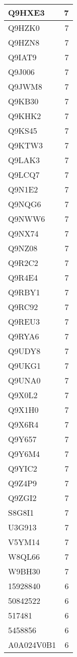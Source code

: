 \documentclass[
]{book}
\theoremstyle{definition}
\theoremstyle{definition}
\theoremstyle{definition}
\theoremstyle{definition}
\theoremstyle{remark}
\begin{document}
\begin{table}
\begin{tabular}{l|r}
\hline
Q9HXE3 & 7\\
\hline
Q9HZK0 & 7\\
\hline
Q9HZN8 & 7\\
\hline
Q9IAT9 & 7\\
\hline
Q9J006 & 7\\
\hline
Q9JWM8 & 7\\
\hline
Q9KB30 & 7\\
\hline
Q9KHK2 & 7\\
\hline
Q9KS45 & 7\\
\hline
Q9KTW3 & 7\\
\hline
Q9LAK3 & 7\\
\hline
Q9LCQ7 & 7\\
\hline
Q9N1E2 & 7\\
\hline
Q9NQG6 & 7\\
\hline
Q9NWW6 & 7\\
\hline
Q9NX74 & 7\\
\hline
Q9NZ08 & 7\\
\hline
Q9R2C2 & 7\\
\hline
Q9R4E4 & 7\\
\hline
Q9RBY1 & 7\\
\hline
Q9RC92 & 7\\
\hline
Q9REU3 & 7\\
\hline
Q9RYA6 & 7\\
\hline
Q9UDY8 & 7\\
\hline
Q9UKG1 & 7\\
\hline
Q9UNA0 & 7\\
\hline
Q9X0L2 & 7\\
\hline
Q9X1H0 & 7\\
\hline
Q9X6R4 & 7\\
\hline
Q9Y657 & 7\\
\hline
Q9Y6M4 & 7\\
\hline
Q9YIC2 & 7\\
\hline
Q9Z4P9 & 7\\
\hline
Q9ZGI2 & 7\\
\hline
S8G8I1 & 7\\
\hline
U3G913 & 7\\
\hline
V5YM14 & 7\\
\hline
W8QL66 & 7\\
\hline
W9BH30 & 7\\
\hline
15928840 & 6\\
\hline
50842522 & 6\\
\hline
517481 & 6\\
\hline
5458856 & 6\\
\hline
A0A024V0B1 & 6\\

\end{tabular}
\end{table}
\end{document}
